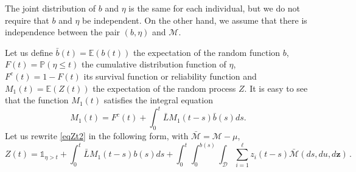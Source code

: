 \documentclass[11pt]{article}
\def\P{{\mathbb P}}
\def\E{{\mathbb E}}
\def\D {\mathcal{D}}
\def\L {\bar{L}}
\def\z {\mathbf{z}}
\begin{document}
The joint distribution of $b$ and $\eta$ is the same for each individual, but we do not require that $b$ and $\eta$ be independent. On the other hand, we assume that there is independence between the pair $(b, \eta)$ and $\mathcal{M}$.

Let us define $\bar{b}(t)=\E(b(t))$ the expectation of the random function $b$, $F(t)=\P(\eta\le t)$ the cumulative distribution function of $\eta$,  $F^c(t)=1-F(t)$ its survival function or reliability function and $M_1(t)= \E(Z(t))$ the expectation of the random process $Z$. It is easy to see that the function $M_1(t)$ satisfies the integral equation
\begin{equation}\label{eqMt1}   
M_1(t)= F^c(t)+  \int_0^t  \L M_1(t-s) \bar{b}(s) ds.
\end{equation} 
 Let us rewrite \eqref{eqZt2} in the following form, with $\bar{\mathcal{M}}=\mathcal{M}-\mu$,
\begin{equation}\label{eqZt3}   
Z(t)= \mathds{1}_{\eta >t} +\int_0^t \L M_1(t-s)  b(s) ds  + \int_0^t \int_0^{b(s)} \int_{\D} \sum_{i=1}^\ell z_i(t-s)  \bar{\mathcal{M}}(ds,du,d\z)\,.
\end{equation} 
 
\end{document}
